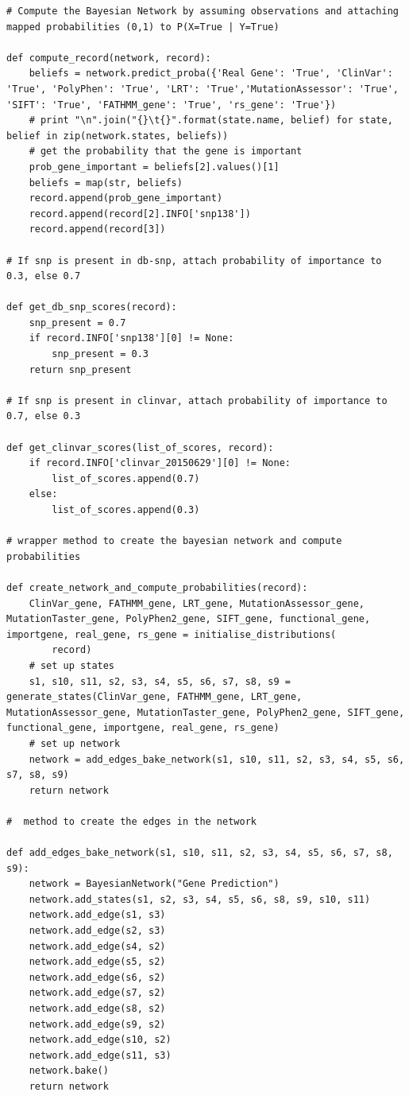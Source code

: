 \documentclass{article}
\begin{document}
\begin{verbatim}
# Compute the Bayesian Network by assuming observations and attaching mapped probabilities (0,1) to P(X=True | Y=True)

def compute_record(network, record):
    beliefs = network.predict_proba({'Real Gene': 'True', 'ClinVar': 'True', 'PolyPhen': 'True', 'LRT': 'True','MutationAssessor': 'True', 'SIFT': 'True', 'FATHMM_gene': 'True', 'rs_gene': 'True'})
    # print "\n".join("{}\t{}".format(state.name, belief) for state, belief in zip(network.states, beliefs))
    # get the probability that the gene is important
    prob_gene_important = beliefs[2].values()[1]
    beliefs = map(str, beliefs)
    record.append(prob_gene_important)
    record.append(record[2].INFO['snp138'])
    record.append(record[3])

# If snp is present in db-snp, attach probability of importance to 0.3, else 0.7

def get_db_snp_scores(record):
    snp_present = 0.7
    if record.INFO['snp138'][0] != None:
        snp_present = 0.3
    return snp_present

# If snp is present in clinvar, attach probability of importance to 0.7, else 0.3

def get_clinvar_scores(list_of_scores, record):
    if record.INFO['clinvar_20150629'][0] != None:
        list_of_scores.append(0.7)
    else:
        list_of_scores.append(0.3)

# wrapper method to create the bayesian network and compute probabilities

def create_network_and_compute_probabilities(record):
    ClinVar_gene, FATHMM_gene, LRT_gene, MutationAssessor_gene, MutationTaster_gene, PolyPhen2_gene, SIFT_gene, functional_gene, importgene, real_gene, rs_gene = initialise_distributions(
        record)
    # set up states
    s1, s10, s11, s2, s3, s4, s5, s6, s7, s8, s9 = generate_states(ClinVar_gene, FATHMM_gene, LRT_gene, MutationAssessor_gene, MutationTaster_gene, PolyPhen2_gene, SIFT_gene, functional_gene, importgene, real_gene, rs_gene)
    # set up network
    network = add_edges_bake_network(s1, s10, s11, s2, s3, s4, s5, s6, s7, s8, s9)
    return network

#  method to create the edges in the network

def add_edges_bake_network(s1, s10, s11, s2, s3, s4, s5, s6, s7, s8, s9):
    network = BayesianNetwork("Gene Prediction")
    network.add_states(s1, s2, s3, s4, s5, s6, s8, s9, s10, s11)
    network.add_edge(s1, s3)
    network.add_edge(s2, s3)
    network.add_edge(s4, s2)
    network.add_edge(s5, s2)
    network.add_edge(s6, s2)
    network.add_edge(s7, s2)
    network.add_edge(s8, s2)
    network.add_edge(s9, s2)
    network.add_edge(s10, s2)
    network.add_edge(s11, s3)
    network.bake()
    return network


\end{verbatim}
\end{document}
